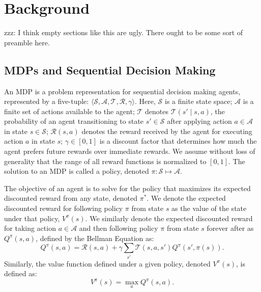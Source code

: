 
\section{Background}


zzz: I think empty sections like this are ugly. There ought to be some sort of preamble here.

\subsection{\acp{MDP} and Sequential Decision Making}
An \ac{MDP} is a problem representation for sequential decision making agents, represented by a five-tuple: $\langle \mathcal{S}, \mathcal{A}, \mathcal{T}, \mathcal{R}, \gamma \rangle$. Here, $\mathcal{S}$ is a finite state space; $\mathcal{A}$ is a finite set of actions available to the agent; $\mathcal{T}$ denotes $\mathcal{T}(s' \mid s,a)$, the probability of an agent transitioning to state $s' \in \mathcal{S}$ after applying action $a \in \mathcal{A}$ in state $s \in \mathcal{S}$; $\mathcal{R}(s,a)$ denotes the reward received by the agent for executing action $a$ in state $s$; $\gamma \in [0, 1]$ is a discount factor that determines how much the agent prefers future rewards over immediate rewards. We assume without loss of generality that the range of all reward functions is normalized to $[0,1]$. The solution to an \ac{MDP} is called a policy, denoted $\pi: \mathcal{S} \mapsto \mathcal{A}$.

The objective of an agent is to solve for the policy that maximizes its expected discounted reward from any state, denoted $\pi^*$. We denote the expected discounted reward for following policy $\pi$ from state $s$ as the value of the state under that policy, $V^\pi(s)$. We similarly denote the expected discounted reward for taking action $a \in \mathcal{A}$ and then following policy $\pi$ from state $s$ forever after as $Q^\pi(s,a)$, defined by the Bellman Equation as:
\begin{equation}
Q^\pi(s,a) = \mathcal{R}(s,a) + \gamma \sum_{s'} \mathcal{T}(s,a,s') Q^\pi(s',\pi(s)).
\end{equation}
Similarly, the value function defined under a given policy, denoted $V^\pi(s)$, is defined as:
\begin{equation}
V^\pi(s) = \max_a Q^\pi(s,a).
\end{equation}

